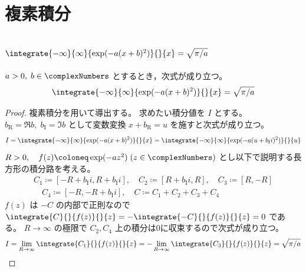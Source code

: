 \chapter{複素積分}
    \section{\texorpdfstring{$\integrate{-\infty}{\infty}{\exp(-a(x+b)^2)}{}{x} = \sqrt{\pi/a}$}{Gauss積分で積分変数にオフセットがある場合}}
        \begin{shadebox}
            $a>0,\;b\in\complexNumbers$ とするとき，次式が成り立つ。
            \[ \integrate{-\infty}{\infty}{\exp(-a(x+b)^2)}{}{x} = \sqrt{\pi/a} \]
        \end{shadebox}
        \begin{proof}
            \quad\par
            複素積分を用いて導出する。
            求めたい積分値を $I$ とする。
            $b_\mathrm{R} = \Re{b},\;b_\mathrm{I} = \Im{b}$ として変数変換 $x+b_\mathrm{R} = u$ を施すと次式が成り立つ。
            \[ I = \integrate{-\infty}{\infty}{\exp(-a(x+b)^2)}{}{x} = \integrate{-\infty}{\infty}{\exp(-a(u+b_\mathrm{I}i)^2)}{}{u} \]
            $R>0,\quad f(z) \coloneq \exp(-az^2)\;(z\in\complexNumbers)$ とし以下で説明する長方形の積分路を考える。
            \begin{gather*}
                C_1 \coloneq [-R+b_\mathrm{I}i,R+b_\mathrm{I}i],\quad C_2 \coloneq [R+b_\mathrm{I}i,R],\quad C_3 \coloneq [R,-R] \\
                \quad C_4 \coloneq [-R,-R+b_\mathrm{I}i],\quad C \coloneq C_1+C_2+C_3+C_4
            \end{gather*}
            $f(z)$ は $-C$ の内部で正則なので $\integrate{C}{}{f(z)}{}{z} = -\integrate{-C}{}{f(z)}{}{z} = 0$ である。
            $R\to\infty$ の極限で $C_2,C_4$ 上の積分は0に収束するので次式が成り立つ。
            \[ I = \lim_{R\to\infty}\integrate{C_1}{}{f(z)}{}{z} = -\lim_{R\to\infty}\integrate{C_3}{}{f(z)}{}{z} = \sqrt{\pi/a} \]
        \end{proof}
